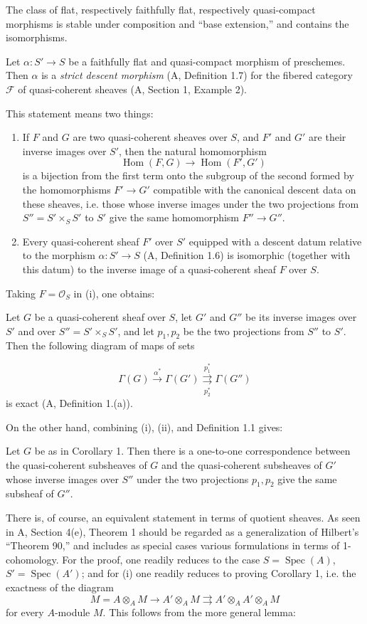 The class of flat, respectively faithfully flat, respectively quasi-compact
morphisms is stable under composition and “base extension,” and contains the
isomorphisms.

 Let $\alpha:S'\longrightarrow S$ be a faithfully flat and
quasi-compact morphism of preschemes. Then $\alpha$ is a \emph{strict descent
morphism} (A, Definition 1.7) for the fibered category $\mathcal F$ of
quasi-coherent sheaves (A, Section 1, Example 2).

This statement means two things:
\begin{enumerate}
\item[(i)] If $F$ and $G$ are two quasi-coherent sheaves over $S$, and $F'$ and
$G'$ are their inverse images over $S'$, then the natural homomorphism
\[
  \operatorname{Hom}(F,G)\longrightarrow\operatorname{Hom}(F',G')
\]
is a bijection from the first term onto the subgroup of the second formed by
the homomorphisms $F'\longrightarrow G'$ compatible with the canonical descent
data on these sheaves, i.e. those whose inverse images under the two
projections from $S''=S'\times_SS'$ to $S'$ give the same homomorphism
$F''\longrightarrow G''$.
\item[(ii)] Every quasi-coherent sheaf $F'$ over $S'$ equipped with a descent
datum relative to the morphism $\alpha:S'\longrightarrow S$
(A, Definition 1.6) is isomorphic (together with this datum) to the inverse
image of a quasi-coherent sheaf $F$ over $S$.
\end{enumerate}
Taking $F=\mathcal O_S$ in (i), one obtains:

 Let $G$ be a quasi-coherent sheaf over $S$, let $G'$ and
$G''$ be its inverse images over $S'$ and over $S''=S'\times_SS'$, and let
$p_1,p_2$ be the two projections from $S''$ to $S'$. Then the following
diagram of maps of sets

\[
  \Gamma(G)\xrightarrow{\alpha^*}\Gamma(G')
  \underset{p_2^*}{\overset{p_1^*}{\rightrightarrows}}\Gamma(G'')
\]
is exact (A, Definition 1.(a)).

On the other hand, combining (i), (ii), and Definition 1.1 gives:

 Let $G$ be as in Corollary 1. Then there is a one-to-one
correspondence between the quasi-coherent subsheaves of $G$ and the
quasi-coherent subsheaves of $G'$ whose inverse images over $S''$ under the two
projections $p_1,p_2$ give the same subsheaf of $G''$.

There is, of course, an equivalent statement in terms of quotient sheaves. As
seen in A, Section 4(e), Theorem 1 should be regarded as a generalization of
Hilbert's “Theorem 90,” and includes as special cases various formulations in
terms of 1-cohomology. For the proof, one readily reduces to the case
$S=\operatorname{Spec}(A)$, $S'=\operatorname{Spec}(A')$; and for (i) one
readily reduces to proving Corollary 1, i.e. the exactness of the diagram
\[
  M=A\otimes_A M\longrightarrow A'\otimes_A M
  \rightrightarrows A'\otimes_AA'\otimes_A M
\]
for every $A$-module $M$. This follows from the more general lemma:

